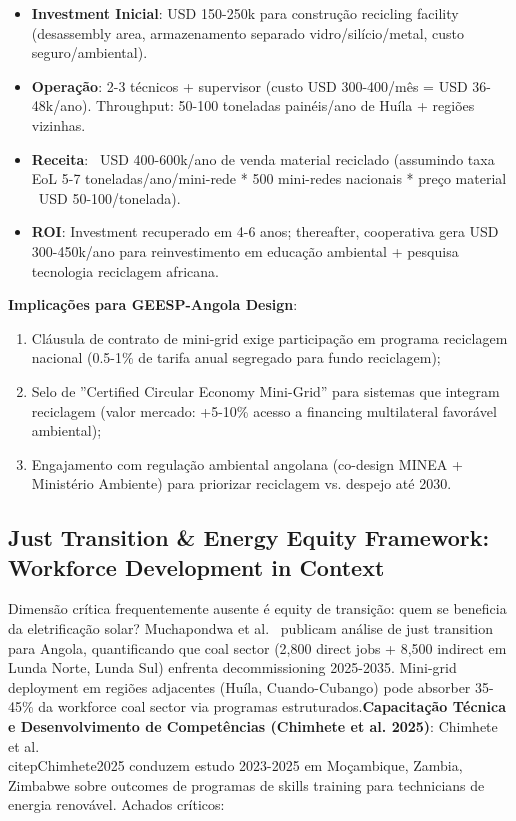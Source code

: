 \documentclass[12pt, a4paper]{article}
\begin{document}
\begin{itemize}
\item \textbf{Investment Inicial}: USD 150-250k para construção recicling facility (desassembly area, armazenamento separado vidro/silício/metal, custo seguro/ambiental).
\item \textbf{Operação}: 2-3 técnicos + supervisor (custo USD 300-400/mês = USD 36-48k/ano). Throughput: 50-100 toneladas painéis/ano de Huíla + regiões vizinhas.
\item \textbf{Receita}: ~USD 400-600k/ano de venda material reciclado (assumindo taxa EoL 5-7 toneladas/ano/mini-rede * 500 mini-redes nacionais * preço material ~USD 50-100/tonelada).
\item \textbf{ROI}: Investment recuperado em 4-6 anos; thereafter, cooperativa gera USD 300-450k/ano para reinvestimento em educação ambiental + pesquisa tecnologia reciclagem africana.
\end{itemize}

\textbf{Implicações para GEESP-Angola Design}:
\begin{enumerate}
\item Cláusula de contrato de mini-grid exige participação em programa reciclagem nacional (0.5-1\% de tarifa anual segregado para fundo reciclagem);
\item Selo de ''Certified Circular Economy Mini-Grid'' para sistemas que integram reciclagem (valor mercado: +5-10\% acesso a financing multilateral favorável ambiental);
\item Engajamento com regulação ambiental angolana (co-design MINEA + Ministério Ambiente) para priorizar reciclagem vs. despejo até 2030.
\end{enumerate}

\subsection{Just Transition \& Energy Equity Framework: Workforce Development in Context}

Dimensão crítica frequentemente ausente é equity de transição: quem se beneficia da eletrificação solar? Muchapondwa et al.~\citep{Muchapondwa2024} publicam análise de just transition para Angola, quantificando que coal sector (2,800 direct jobs + 8,500 indirect em Lunda Norte, Lunda Sul) enfrenta decommissioning 2025-2035. Mini-grid deployment em regiões adjacentes (Huíla, Cuando-Cubango) pode absorber 35-45\% da workforce coal sector via programas estruturados.\textbf{Capacitação Técnica e Desenvolvimento de Competências (Chimhete et al. 2025)}: Chimhete et al.~\\citep{Chimhete2025} conduzem estudo 2023-2025 em Moçambique, Zambia, Zimbabwe sobre outcomes de programas de skills training para technicians de energia renovável. Achados críticos:
\end{document}
